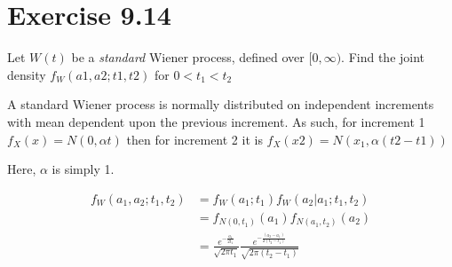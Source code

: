 \documentclass[12pt]{article}
\newcommand{\mysection}[1]{\section*{#1}}
\begin{document}
\mysection{Exercise 9.14} 
Let $W(t)$ be a \emph{standard} Wiener process, defined over $[0, \infty)$. Find the joint density $f_W(a1, a2;t1, t2)$ for $0<t_1<t_2$ %

A standard Wiener process is normally distributed on independent increments with mean dependent upon the previous increment. 
As such, for increment 1 $f_X(x)=N(0,\alpha t)$ then for increment 2 it is $f_X(x2)=N(x_1,\alpha (t2-t1))$

Here, $\alpha$ is simply 1.

\begin{align*}
  f_W(a_1, a_2;t_1,t_2)&=f_W(a_1;t_1)f_W(a_2|a_1;t_1,t_2)\\
                       &=f_{N(0,t_1)}(a_1)f_{N(a_1,t_2)}(a_2)\\
                       &=\frac{e^{-\frac{a_1}{2t_1}}}{\sqrt{2\pi t_1}} 
                         \frac{e^{-\frac{(a_2-a_1)}{2(t_2-t_1)}}}{\sqrt{2\pi (t_2-t_1)}} 
\end{align*}




\newpage
\end{document}
